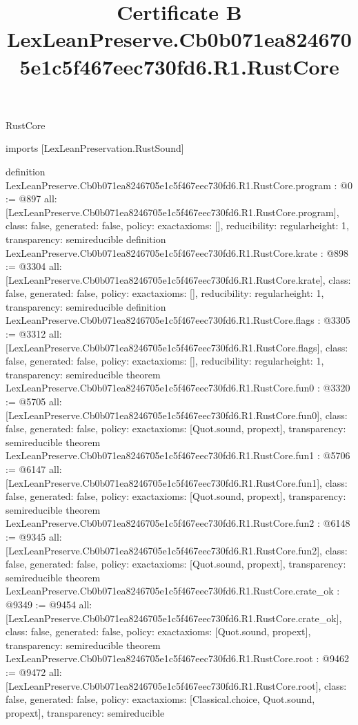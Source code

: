 \begin{lexlean}{RustCore}
\title{Certificate B LexLeanPreserve.Cb0b071ea8246705e1c5f467eec730fd6.R1.RustCore}
\begin{coremodule}
imports [LexLeanPreservation.RustSound]

definition LexLeanPreserve.Cb0b071ea8246705e1c5f467eec730fd6.R1.RustCore.program : @0 := @897 {
  all: [LexLeanPreserve.Cb0b071ea8246705e1c5f467eec730fd6.R1.RustCore.program],
  class: false,
  generated: false,
  policy: exact{axioms: []},
  reducibility: regular{height: 1},
  transparency: semireducible
}
definition LexLeanPreserve.Cb0b071ea8246705e1c5f467eec730fd6.R1.RustCore.krate : @898 := @3304 {
  all: [LexLeanPreserve.Cb0b071ea8246705e1c5f467eec730fd6.R1.RustCore.krate],
  class: false,
  generated: false,
  policy: exact{axioms: []},
  reducibility: regular{height: 1},
  transparency: semireducible
}
definition LexLeanPreserve.Cb0b071ea8246705e1c5f467eec730fd6.R1.RustCore.flags : @3305 := @3312 {
  all: [LexLeanPreserve.Cb0b071ea8246705e1c5f467eec730fd6.R1.RustCore.flags],
  class: false,
  generated: false,
  policy: exact{axioms: []},
  reducibility: regular{height: 1},
  transparency: semireducible
}
theorem LexLeanPreserve.Cb0b071ea8246705e1c5f467eec730fd6.R1.RustCore.fun0 : @3320 := @5705 {
  all: [LexLeanPreserve.Cb0b071ea8246705e1c5f467eec730fd6.R1.RustCore.fun0],
  class: false,
  generated: false,
  policy: exact{axioms: [Quot.sound, propext]},
  transparency: semireducible
}
theorem LexLeanPreserve.Cb0b071ea8246705e1c5f467eec730fd6.R1.RustCore.fun1 : @5706 := @6147 {
  all: [LexLeanPreserve.Cb0b071ea8246705e1c5f467eec730fd6.R1.RustCore.fun1],
  class: false,
  generated: false,
  policy: exact{axioms: [Quot.sound, propext]},
  transparency: semireducible
}
theorem LexLeanPreserve.Cb0b071ea8246705e1c5f467eec730fd6.R1.RustCore.fun2 : @6148 := @9345 {
  all: [LexLeanPreserve.Cb0b071ea8246705e1c5f467eec730fd6.R1.RustCore.fun2],
  class: false,
  generated: false,
  policy: exact{axioms: [Quot.sound, propext]},
  transparency: semireducible
}
theorem LexLeanPreserve.Cb0b071ea8246705e1c5f467eec730fd6.R1.RustCore.crate_ok : @9349 := @9454 {
  all: [LexLeanPreserve.Cb0b071ea8246705e1c5f467eec730fd6.R1.RustCore.crate_ok],
  class: false,
  generated: false,
  policy: exact{axioms: [Quot.sound, propext]},
  transparency: semireducible
}
theorem LexLeanPreserve.Cb0b071ea8246705e1c5f467eec730fd6.R1.RustCore.root : @9462 := @9472 {
  all: [LexLeanPreserve.Cb0b071ea8246705e1c5f467eec730fd6.R1.RustCore.root],
  class: false,
  generated: false,
  policy: exact{axioms: [Classical.choice, Quot.sound, propext]},
  transparency: semireducible
}


\end{coremodule}
\end{lexlean}
